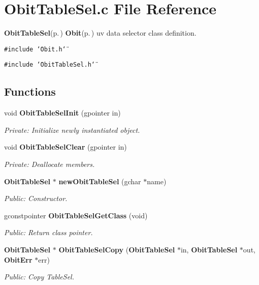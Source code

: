 \section{Obit\-Table\-Sel.c File Reference}
\label{ObitTableSel_8c}
{\bf Obit\-Table\-Sel}{\rm (p.\,\pageref{structObitTableSel})} {\bf Obit}{\rm (p.\,\pageref{structObit})} uv data selector class definition. 

{\tt \#include \char`\"{}Obit.h\char`\"{}}\par
{\tt \#include \char`\"{}Obit\-Table\-Sel.h\char`\"{}}\par
\subsection*{Functions}
\begin{CompactItemize}
\item 
void {\bf Obit\-Table\-Sel\-Init} (gpointer in)
\begin{CompactList}\small\item\em Private: Initialize newly instantiated object. \item\end{CompactList}\item 
void {\bf Obit\-Table\-Sel\-Clear} (gpointer in)
\begin{CompactList}\small\item\em Private: Deallocate members. \item\end{CompactList}\item 
{\bf Obit\-Table\-Sel} $\ast$ {\bf new\-Obit\-Table\-Sel} (gchar $\ast$name)
\begin{CompactList}\small\item\em Public: Constructor. \item\end{CompactList}\item 
gconstpointer {\bf Obit\-Table\-Sel\-Get\-Class} (void)
\begin{CompactList}\small\item\em Public: Return class pointer. \item\end{CompactList}\item 
{\bf Obit\-Table\-Sel} $\ast$ {\bf Obit\-Table\-Sel\-Copy} ({\bf Obit\-Table\-Sel} $\ast$in, {\bf Obit\-Table\-Sel} $\ast$out, {\bf Obit\-Err} $\ast$err)
\begin{CompactList}\small\item\em Public: Copy Table\-Sel. \item\end{CompactList}\item 

\end{CompactItemize}
